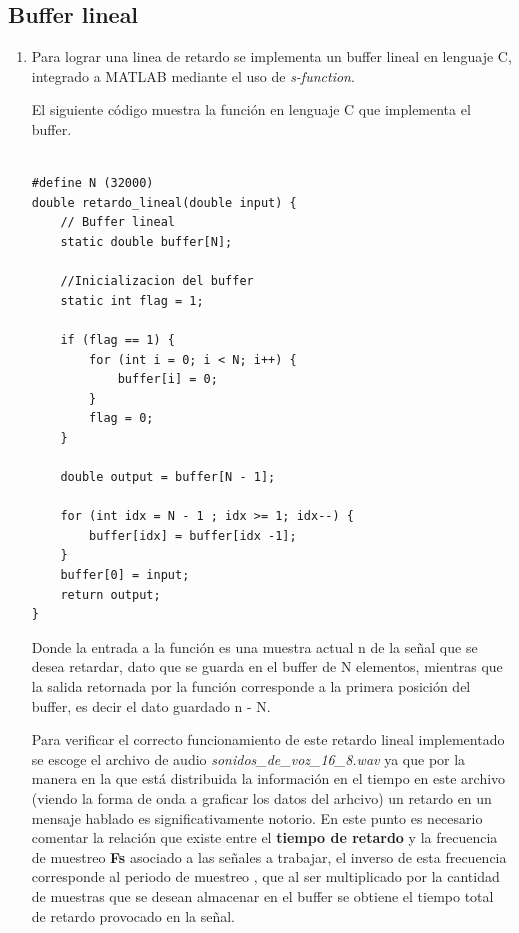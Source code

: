 \subsection{Buffer lineal}


\begin{enumerate}
    \item 

Para lograr una linea de retardo se implementa un buffer lineal en lenguaje C, integrado a MATLAB mediante el uso de \textit{s-function}.

El siguiente código muestra la función en lenguaje C que implementa el buffer.

    \begin{lstlisting}
    
#define N (32000)
double retardo_lineal(double input) {
	// Buffer lineal
	static double buffer[N];
    
    //Inicializacion del buffer
	static int flag = 1;
    
	if (flag == 1) {
		for (int i = 0; i < N; i++) {
			buffer[i] = 0;
		}
		flag = 0;
	}

	double output = buffer[N - 1];

	for (int idx = N - 1 ; idx >= 1; idx--) {
		buffer[idx] = buffer[idx -1];
	}
	buffer[0] = input;
	return output;
}

    \end{lstlisting}
    
    Donde la entrada a la función es una muestra actual n de la señal que se desea retardar, dato que se guarda en el buffer de N elementos, mientras que la salida retornada por la función corresponde a la primera posición del buffer, es decir el dato guardado  n - N.
    
    
    
    
    Para verificar el correcto funcionamiento de este retardo lineal implementado se escoge el archivo de audio \textit{sonidos\_de\_voz\_16\_8.wav} ya que por la manera en la que está distribuida la información  en el tiempo en este archivo (viendo la forma de onda a graficar los datos del arhcivo) un retardo en un mensaje hablado es significativamente notorio. En este punto es necesario comentar la relación que existe entre el \textbf{tiempo de retardo}  y la frecuencia de muestreo \textbf{Fs} asociado a las señales a trabajar, el inverso de esta frecuencia corresponde al periodo de muestreo , que al ser multiplicado por la cantidad de muestras que se desean almacenar en el buffer se obtiene el tiempo total de retardo provocado en la señal. 
    

\end{enumerate}

